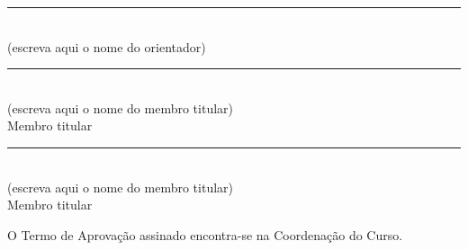\begin{folhadeaprovacao}
    \vfill

    \begin{center}
        \rule{0.6\textwidth}{0.4pt}\\
        (escreva aqui o nome do orientador)\\
        \imprimirorientador

        \vspace{2em}
        \rule{0.6\textwidth}{0.4pt}\\
        (escreva aqui o nome do membro titular)\\
        Membro titular

        \vspace{2em}
        \rule{0.6\textwidth}{0.4pt}\\
        (escreva aqui o nome do membro titular)\\
        Membro titular
    \end{center}

    \vfill
    \begin{center}
        \footnotesize O Termo de Aprovação assinado encontra-se na Coordenação do Curso.
    \end{center}
 


\end{folhadeaprovacao}